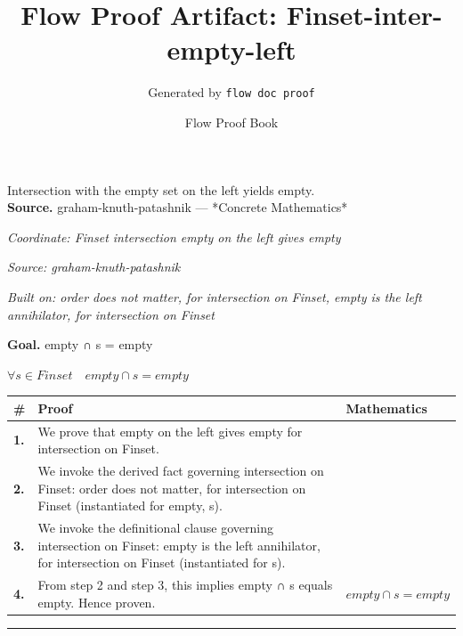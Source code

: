 \documentclass[11pt]{article}
\title{Flow Proof Artifact: Finset-inter-empty-left}
\author{Generated by \texttt{flow doc proof}}
\date{Flow Proof Book}
\theoremstyle{definition}
\begin{document}
\maketitle
Intersection with the empty set on the left yields empty.\\[0.5em]
\textbf{Source.} graham-knuth-patashnik — *Concrete Mathematics*\\[0.5em]
\bigskip
{}\par
\smallskip\noindent\textit{Coordinate: Finset \cdot intersection \cdot empty on the left gives empty}\par
\smallskip\noindent\textit{Source: graham-knuth-patashnik}\par
\smallskip\noindent\textit{Built on: order does not matter, for intersection on Finset, empty is the left annihilator, for intersection on Finset}\par
\medskip
\noindent\textbf{Goal.} empty ∩ s = empty\par
\noindent$\displaystyle \forall s \in Finset\quad empty ∩ s = empty$\par
\medskip
\noindent
\begin{tabular}{@{} >{\raggedright\arraybackslash}p{} >{\raggedright\arraybackslash}p{} >{\raggedleft\arraybackslash}p{} @{}}
\textbf{\#} & \textbf{Proof} & \textbf{Mathematics} \\
\midrule
\textbf{1.} & We prove that empty on the left gives empty for intersection on Finset. & \\[0.45em]
\textbf{2.} & We invoke the derived fact governing intersection on Finset: order does not matter, for intersection on Finset (instantiated for empty, s). & \\[0.45em]
\textbf{3.} & We invoke the definitional clause governing intersection on Finset: empty is the left annihilator, for intersection on Finset (instantiated for s). & \\[0.45em]
\textbf{4.} & From step 2 and step 3, this implies empty ∩ s equals empty. Hence proven. & $\displaystyle empty ∩ s = empty$ \\[0.45em]
\bottomrule
\end{tabular}
\label{thm:Finset-intersection-empty_on_the_left_gives_empty}
\par\medskip\hrule
\end{document}
